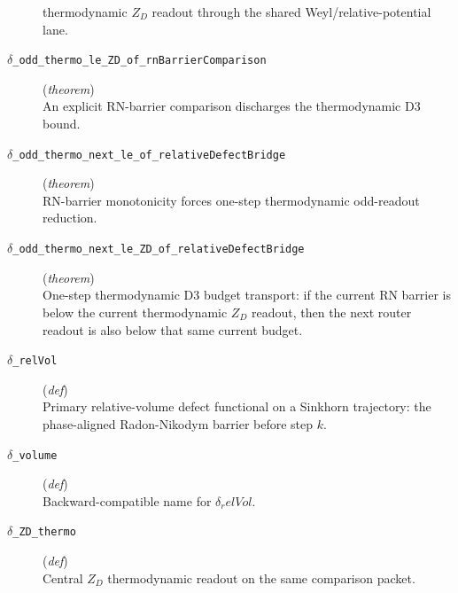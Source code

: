 \documentclass[11pt,a4paper]{article}
\begin{document}
\begin{description}
thermodynamic $Z_D$ readout through the shared Weyl/relative-potential lane.
  \item[\texttt{$\delta $\_odd\_thermo\_le\_ZD\_of\_rnBarrierComparison}] (\textit{theorem}) \\ An explicit RN-barrier comparison discharges the thermodynamic D3 bound.
  \item[\texttt{$\delta $\_odd\_thermo\_next\_le\_of\_relativeDefectBridge}] (\textit{theorem}) \\ RN-barrier monotonicity forces one-step thermodynamic odd-readout reduction.
  \item[\texttt{$\delta $\_odd\_thermo\_next\_le\_ZD\_of\_relativeDefectBridge}] (\textit{theorem}) \\ One-step thermodynamic D3 budget transport: if the current RN barrier is below 
the current thermodynamic $Z_D$ readout, then the next router readout is also 
below that same current budget.
  \item[\texttt{$\delta $\_relVol}] (\textit{def}) \\ Primary relative-volume defect functional on a Sinkhorn trajectory: 
the phase-aligned Radon-Nikodym barrier before step $k$.
  \item[\texttt{$\delta $\_volume}] (\textit{def}) \\ Backward-compatible name for $\delta _relVol$.
  \item[\texttt{$\delta $\_ZD\_thermo}] (\textit{def}) \\ Central $Z_D$ thermodynamic readout on the same comparison packet.
\end{description}
\end{document}
